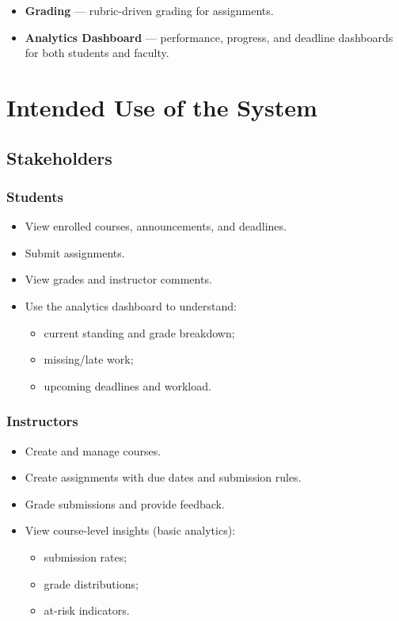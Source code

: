 \documentclass[11pt, legalpaper]{article}
\begin{document}
\begin{itemize}
  \item \textbf{Grading} — rubric-driven grading for assignments.
  \item \textbf{Analytics Dashboard} — performance, progress, and deadline
        dashboards for both students and faculty.
\end{itemize}

\section{Intended Use of the System}

\subsection{Stakeholders}

\subsubsection*{Students}
\begin{itemize}
  \item View enrolled courses, announcements, and deadlines.
  \item Submit assignments.
  \item View grades and instructor comments.
  \item Use the analytics dashboard to understand:
    \begin{itemize}
      \item current standing and grade breakdown;
      \item missing/late work;
      \item upcoming deadlines and workload.
    \end{itemize}
\end{itemize}

\subsubsection*{Instructors}
\begin{itemize}
  \item Create and manage courses.
  \item Create assignments with due dates and submission rules.
  \item Grade submissions and provide feedback.
  \item View course-level insights (basic analytics):
    \begin{itemize}
      \item submission rates;
      \item grade distributions;
      \item at-risk indicators.
    \end{itemize}
\end{itemize}
\end{document}
